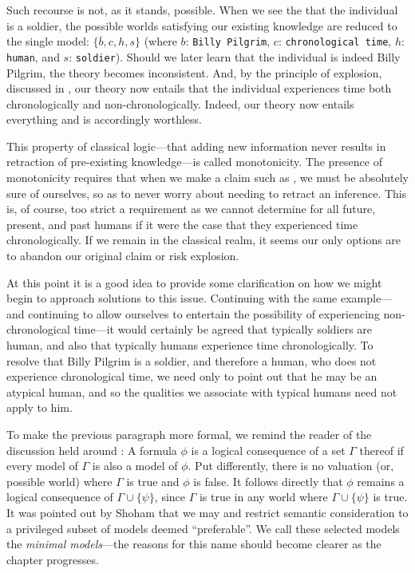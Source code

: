 Such recourse is not, as it stands, possible. When we see the that the individual is a soldier, the possible worlds
satisfying our existing knowledge are reduced to the single model: $\{\overline{b},c, h,s\}$ (where $b$: \texttt{Billy
Pilgrim}, $c$: \texttt{chronological time}, $h$: \texttt{human}, and $s$: \texttt{soldier}). Should we later learn that the
individual is indeed Billy Pilgrim, the theory becomes inconsistent.
And, by the principle of explosion, discussed in , our theory now entails that the
individual experiences time both chronologically and non-chronologically. Indeed, our theory now entails everything and
is accordingly worthless.

This property of classical logic---that adding new information never results in retraction of pre-existing knowledge---is
called monotonicity. The presence of monotonicity requires that when we make a claim such as ,
we must be absolutely sure of ourselves, so as to never worry about needing to retract an inference. This is, of course,
too strict a requirement as we cannot determine for all future, present, and past humans if it were the case that they experienced
time chronologically. If we remain in the classical realm, it seems our only options are to abandon our original claim or
risk explosion.

At this point it is a good idea to provide some clarification on how we might begin to approach solutions to this issue.
Continuing with the same example---and continuing to allow ourselves to entertain the possibility of experiencing non-chronological
time---it would certainly be agreed that typically soldiers are human, and also that typically humans experience time chronologically.
To resolve that Billy Pilgrim is a soldier, and therefore a human, who does not experience chronological time, we need only
to point out that he may be an atypical human, and so the qualities we associate with typical humans need not apply to
him.

To make the previous paragraph more formal, we remind the reader of the discussion held around :
A formula $\phi$ is a logical consequence of a set $\Gamma$ thereof if every model of $\Gamma$ is also a model of $\phi$.
Put differently, there is no valuation (or, possible world) where $\Gamma$ is true and $\phi$ is false. It follows
directly that $\phi$ remains a logical consequence of $\Gamma \cup \{\psi\}$, since $\Gamma$ is true in any world where $\Gamma
\cup \{\psi\}$ is true. It was pointed out by Shoham \cite{shohamSemanticApproach} that we may  and restrict
semantic consideration to a privileged subset of models deemed ``preferable''. We call these selected models the \textit{minimal
models}---the reasons for this name should become clearer as the chapter progresses.

